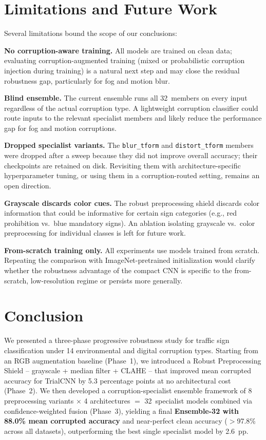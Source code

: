 \documentclass[conference]{IEEEtran}
\begin{document}
\section{Limitations and Future Work}
\label{sec:future}
Several limitations bound the scope of our conclusions:

\textbf{No corruption-aware training.} All models are trained on clean data; evaluating corruption-augmented training (mixed or probabilistic corruption injection during training) is a natural next step and may close the residual robustness gap, particularly for fog and motion blur.

\textbf{Blind ensemble.} The current ensemble runs all 32~members on every input regardless of the actual corruption type. A lightweight corruption classifier could route inputs to the relevant specialist members and likely reduce the performance gap for fog and motion corruptions.

\textbf{Dropped specialist variants.} The \texttt{blur\_tform} and \texttt{distort\_tform} members were dropped after a sweep because they did not improve overall accuracy; their checkpoints are retained on disk. Revisiting them with architecture-specific hyperparameter tuning, or using them in a corruption-routed setting, remains an open direction.

\textbf{Grayscale discards color cues.} The robust preprocessing shield discards color information that could be informative for certain sign categories (e.g., red prohibition vs.\ blue mandatory signs). An ablation isolating grayscale vs.\ color preprocessing for individual classes is left for future work.

\textbf{From-scratch training only.} All experiments use models trained from scratch. Repeating the comparison with ImageNet-pretrained initialization would clarify whether the robustness advantage of the compact CNN is specific to the from-scratch, low-resolution regime or persists more generally.

\section{Conclusion}
We presented a three-phase progressive robustness study for traffic sign classification under 14 environmental and digital corruption types. Starting from an RGB augmentation baseline (Phase~1), we introduced a Robust Preprocessing Shield -- grayscale + median filter + CLAHE -- that improved mean corrupted accuracy for TrialCNN by 5.3 percentage points at no architectural cost (Phase~2). We then developed a corruption-specialist ensemble framework of 8 preprocessing variants $\times$ 4 architectures $=$ 32~specialist models combined via confidence-weighted fusion (Phase~3), yielding a final \textbf{Ensemble-32 with 88.0\% mean corrupted accuracy} and near-perfect clean accuracy ($>$97.8\% across all datasets), outperforming the best single specialist model by 2.6~pp.
\end{document}

